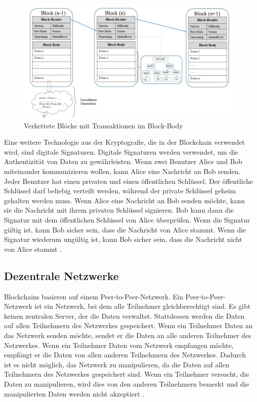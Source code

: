 \begin{figure}[H]
    \centering
    \includegraphics[width=1\linewidth]{images/chain_of_blocks_with_merkle_tree.png}
    \caption{Verkettete Blöcke mit Transaktionen im Block-Body \parencite[S. 95035]{Nam_51PercentAttacks}}
    \label{fig:chain_of_blocks_with_merkle_tree}
\end{figure}


\noindent Eine weitere Technologie aus der Kryptografie, die in der Blockchain verwendet wird, sind digitale Signaturen. Digitale Signaturen werden verwendet, um die Authentizität von Daten zu gewährleisten. Wenn zwei Benutzer Alice und Bob miteinander kommunizieren wollen, kann Alice eine Nachricht an Bob senden. Jeder Benutzer hat einen privaten und einen öffentlichen Schlüssel. Der öffentliche Schlüssel darf beliebig verteilt werden, während der private Schlüssel geheim gehalten werden muss. Wenn Alice eine Nachricht an Bob senden möchte, kann sie die Nachricht mit ihrem privaten Schlüssel signieren. Bob kann dann die Signatur mit dem öffentlichen Schlüssel von Alice überprüfen. Wenn die Signatur gültig ist, kann Bob sicher sein, dass die Nachricht von Alice stammt. Wenn die Signatur wiederum ungültig ist, kann Bob sicher sein, dass die Nachricht nicht von Alice stammt \parencite[S. 9-10]{Fill_BlockchainGrundlagen}.


\subsection{Dezentrale Netzwerke}

Blockchains basieren auf einem Peer-to-Peer-Netzwerk. Ein Peer-to-Peer-Netzwerk ist ein Netzwerk, bei dem alle Teilnehmer gleichberechtigt sind. Es gibt keinen zentralen Server, der die Daten verwaltet. Stattdessen werden die Daten auf allen Teilnehmern des Netzwerkes gespeichert. Wenn ein Teilnehmer Daten an das Netzwerk senden möchte, sendet er die Daten an alle anderen Teilnehmer des Netzwerkes. Wenn ein Teilnehmer Daten vom Netzwerk empfangen möchte, empfängt er die Daten von allen anderen Teilnehmern des Netzwerkes. Dadurch ist es nicht möglich, das Netzwerk zu manipulieren, da die Daten auf allen Teilnehmern des Netzwerkes gespeichert sind. Wenn ein Teilnehmer versucht, die Daten zu manipulieren, wird dies von den anderen Teilnehmern bemerkt und die manipulierten Daten werden nicht akzeptiert \parencite[S. 10/31]{Fill_BlockchainGrundlagen}.

